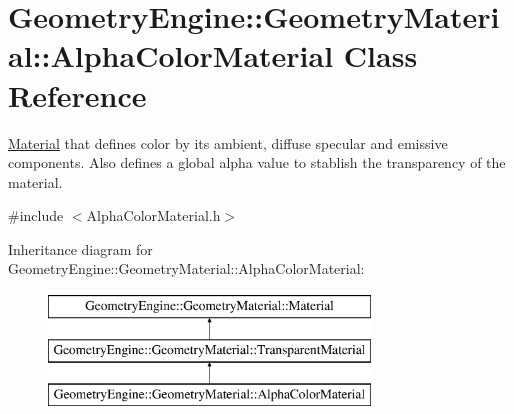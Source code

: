 \hypertarget{class_geometry_engine_1_1_geometry_material_1_1_alpha_color_material}{}\section{Geometry\+Engine\+::Geometry\+Material\+::Alpha\+Color\+Material Class Reference}
\label{class_geometry_engine_1_1_geometry_material_1_1_alpha_color_material}


\mbox{\hyperlink{class_geometry_engine_1_1_geometry_material_1_1_material}{Material}} that defines color by its ambient, diffuse specular and emissive components. Also defines a global alpha value to stablish the transparency of the material.  




{\ttfamily \#include $<$Alpha\+Color\+Material.\+h$>$}

Inheritance diagram for Geometry\+Engine\+::Geometry\+Material\+::Alpha\+Color\+Material\+:\begin{figure}[H]
\begin{center}
\leavevmode
\includegraphics[height=3.000000cm]{class_geometry_engine_1_1_geometry_material_1_1_alpha_color_material}
\end{center}
\end{figure}
